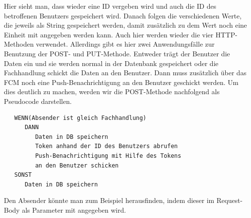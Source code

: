 Hier sieht man, dass wieder eine ID vergeben wird und auch die ID des betroffenen Benutzers gespeichert wird. Danach folgen die verschiedenen Werte, die jeweils als String gespeichert werden, damit zusätzlich zu dem Wert noch eine Einheit mit angegeben werden kann. Auch hier werden wieder die vier HTTP-Methoden verwendet. Allerdings gibt es hier zwei Anwendungsfälle zur Benutzung der POST- und PUT-Methode. Entweder trägt der Benutzer die Daten ein und sie werden normal in der Datenbank gespeichert oder die Fachhandlung schickt die Daten an den Benutzer. Dann muss zusätzlich über das FCM noch eine Push-Benachrichtigung an den Benutzer geschickt werden. Um dies deutlich zu machen, werden wir die POST-Methode nachfolgend als Pseudocode darstellen.

\begin{lstlisting}
   WENN(Absender ist gleich Fachhandlung)
      DANN
         Daten in DB speichern
         Token anhand der ID des Benutzers abrufen
         Push-Benachrichtigung mit Hilfe des Tokens 
         an den Benutzer schicken
   SONST
      Daten in DB speichern
\end{lstlisting}

Den Absender könnte man zum Beispiel herausfinden, indem dieser im Request-Body als Parameter mit angegeben wird.

\subsection{}